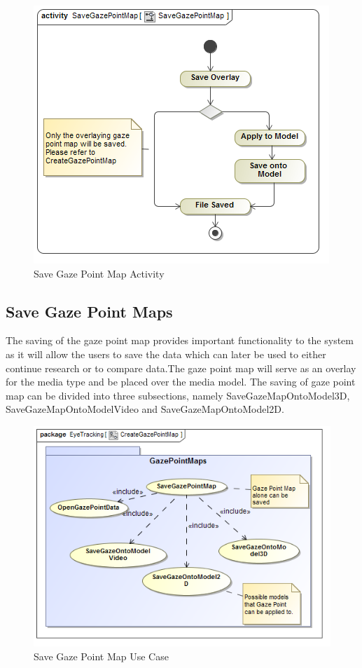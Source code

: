 	\begin{figure}[!ht]
		\centering
		\includegraphics[scale=0.5]{Diagrams/Activity_Diagram__SaveGazePointMap__SaveGazePointMap.png}
		\caption{Save Gaze Point Map Activity}
	\end{figure}
	
\subsection{Save Gaze Point Maps}
	The saving of the gaze point map provides important functionality to the system as it will allow the users to save the data which can later be used to either continue research or to compare data.The gaze point map will serve as an overlay for the media type and be placed over the media model. The saving of gaze point map can be divided into three subsections, namely SaveGazeMapOntoModel3D, SaveGazeMapOntoModelVideo and SaveGazeMapOntoModel2D.
	\newline
	
	\begin{figure}[!ht]
		\centering
		\includegraphics[scale=0.5]{Diagrams/Use_Case_Diagram__CreateGazePointMap.png}\newline
		\caption{Save Gaze Point Map Use Case}
	\end{figure}		
		
